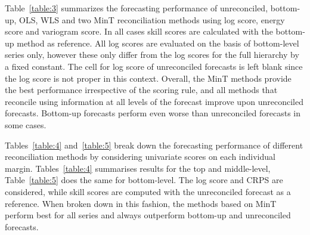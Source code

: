 \documentclass[a4paper, 11pt]{article}
\theoremstyle{definition}
\begin{document}
Table~\ref{table:3} summarizes the forecasting performance of unreconciled, bottom-up, OLS, WLS and two MinT reconciliation methods using log score, energy score and variogram score. In all cases skill scores are calculated with the bottom-up method as reference. All log scores are evaluated on the basis of bottom-level series only, however these only differ from the log scores for the full hierarchy by a fixed constant. The cell for log score of unreconciled forecasts is left blank since the log score is not proper in this context. Overall, the MinT methods provide the best performance irrespective of the scoring rule, and all methods that reconcile using information at all levels of the forecast improve upon unreconciled forecasts. Bottom-up forecasts perform even worse than unreconciled forecasts in some cases.

Tables~\ref{table:4} and~\ref{table:5} break down the forecasting performance of different reconciliation methods by considering univariate scores on each individual margin.  Tables~\ref{table:4} summarises results for the top and middle-level, Table~\ref{table:5} does the same for bottom-level. The log score and CRPS are considered, while skill scores are computed with the unreconciled forecast as a reference. When broken down in this fashion, the methods based on MinT perform best for all series and always outperform bottom-up and unreconciled forecasts.
\end{document}
